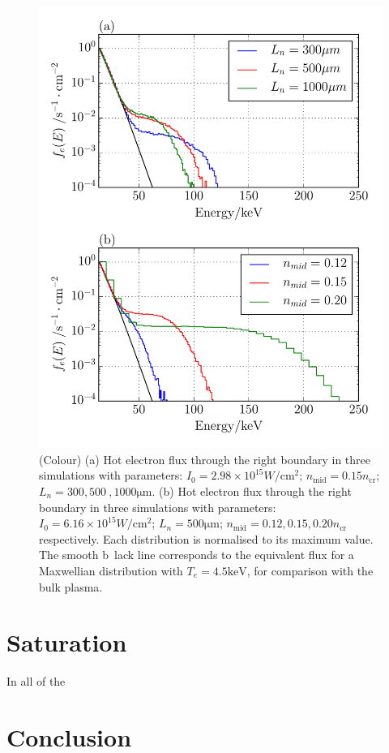 \begin{figure}[ht]
   \centering
    \includegraphics[width=0.75\columnwidth]{Chapters/C4_iSRS/fig7_7a_7b.pdf}
    \caption{(Colour) (a) Hot electron flux through the right boundary in three simulations with parameters: $I_0 = 2.98\times 10^{15} \si{W / \centi \metre^2}$; $n_\mathrm{mid}=0.15 n_\mathrm{cr}$; $L_n=300,500\
,1000\si{\micro\metre}$.   (b) Hot electron flux through the right boundary in three simulations with parameters:
   $I_0 = 6.16\times 10^{15} \si{W / \centi \metre^2}$;  $L_n=500\si{\micro\metre}$; $n_\mathrm{mid}=0.12,0.15,0.20 n_\mathrm{cr}$ respectively. Each distribution is normalised to its maximum value. The smooth b\
lack line corresponds to the equivalent flux for a Maxwellian
   distribution with $T_e=4.5\si{\kilo \electronvolt}$, for comparison with the
   bulk plasma.}
    \label{fig:hotelectrons}
\end{figure}{}



\section{Saturation}
In all of the 

\section{Conclusion}\label{sec:conclusion}

%
